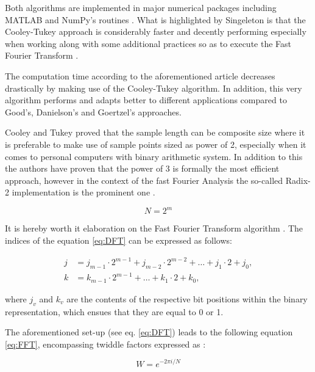 {{Both algorithms are implemented in major numerical packages including MATLAB and NumPy's routines \cite{FFT}. What is highlighted  by Singeleton is that the Cooley-Tukey approach is considerably faster and decently performing especially when working along with some additional practices so as to execute the Fast Fourier Transform \cite{Singeleton1967}. 

The computation time according to the aforementioned article decreases drastically by making use of the Cooley-Tukey algorithm. In addition, this very algorithm performs and adapts better to different applications compared to Good's, Danielson's and Goertzel's approaches.

Cooley and Tukey proved that the sample length can be composite size where it is preferable to make use of sample points sized as power of 2, especially when it comes to personal computers with binary arithmetic system. In addition to this the authors have proven that the power of 3 is formally the most efficient approach, however in the context of the fast Fourier Analysis the so-called Radix-2 implementation is the prominent one \cite{CooleyTukey1965}.

\begin{equation}
	N = 2^m \label{eq:radix_condition}
\end{equation} 

It is hereby worth it elaboration on the Fast Fourier Transform algorithm \cite{CooleyTukey1965}. The indices of the equation \eqref{eq:DFT} can be expressed as follows: 

\begin{equation}
	\begin{aligned}
		j &= j_{m-1} \cdot 2^{m-1} + j_{m-2} \cdot 2^{m-2} + \dots + j_1 \cdot 2 + j_0, \\
		k &= k_{m-1} \cdot 2^{m-1} + \dots + k_1 \cdot 2 + k_0,
	\end{aligned}
\end{equation}

where \( j_{v} \) and \( k_{v} \) are the contents of the respective bit positions within the binary representation, which ensues that they are equal to 0 or 1.

The aforementioned set-up (see eq. \eqref{eq:DFT}) leads to the following equation \eqref{eq:FFT}, encompassing twiddle factors expressed as \cite{CooleyTukey1965}:

\begin{equation}
	W = e^{-2\pi i/N}
	\label{eq:twiddle}
\end{equation}

}}
